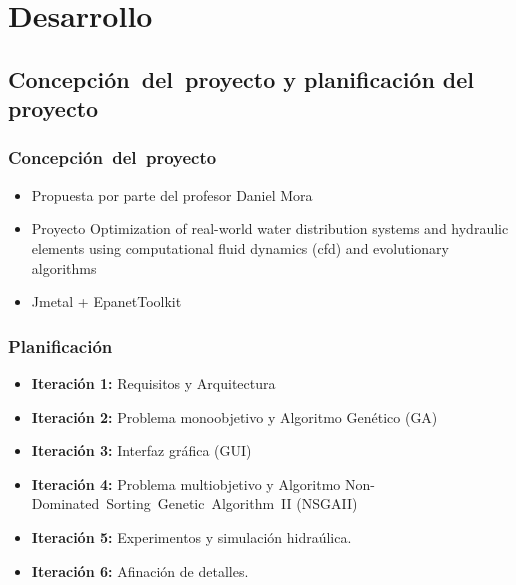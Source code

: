 \documentclass[9pt]{beamer}
\begin{document}
    \section{Desarrollo}

    \subsection{Concepción del proyecto y planificación del proyecto}
    \begin{frame}
        \frametitle{Concepción del proyecto}                 
        \begin{itemize}
            \item Propuesta por parte del profesor Daniel Mora
            \item Proyecto Optimization of real-world water distribution systems and hydraulic elements using computational fluid dynamics (cfd) and evolutionary algorithms
            \item Jmetal + EpanetToolkit
        \end{itemize}
    \end{frame}

    \begin{frame}
        \frametitle{Planificación}                 
        \begin{itemize}
            \item \textbf{Iteración 1:} Requisitos y Arquitectura
            \item \textbf{Iteración 2:} Problema monoobjetivo y Algoritmo Genético (GA)
            \item \textbf{Iteración 3:} Interfaz gráfica (GUI)
            \item \textbf{Iteración 4:} Problema multiobjetivo y Algoritmo Non-Dominated Sorting Genetic Algorithm II (NSGAII)
            \item \textbf{Iteración 5:} Experimentos y simulación hidraúlica.
            \item \textbf{Iteración 6:} Afinación de detalles.
        \end{itemize}
    \end{frame}
\end{document}

